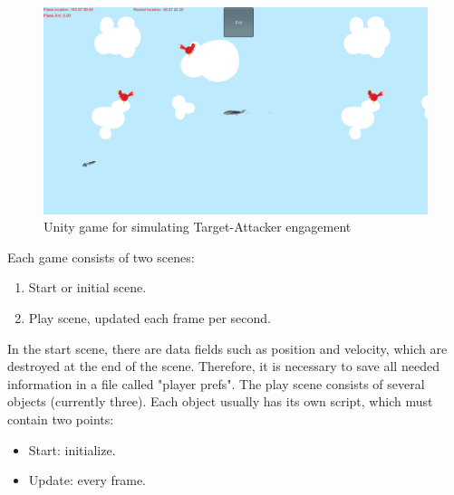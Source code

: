  \begin{figure}[H]
 	\centering
 	\includegraphics[scale = 0.32]{fig/unityGame.PNG}
 	\caption{Unity game for simulating Target-Attacker engagement}
 	\label{UnityGame}
 \end{figure}
 

Each game consists of two scenes:

\begin{enumerate}
	\item Start or initial scene.
	\item Play scene, updated each frame per second.
\end{enumerate}

In the start scene, there are data fields such as position and velocity, which are destroyed at the end of the scene. Therefore, it is necessary to save all needed information in a file called "player prefs". The play scene consists of several objects (currently three). Each object usually has its own script, which must contain two points:
\begin{itemize}
	\item Start: initialize.
	\item Update: every frame.
\end{itemize} 

